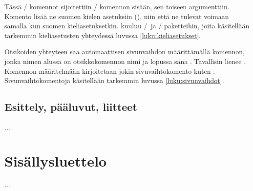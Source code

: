 \begin{koodilohkosis}
  \addto{\captionsfinnish}{
    \renewcommand{\partname}{Kausi}
    \renewcommand{\chaptername}{Päivä}
  }
\end{koodilohkosis}

Tässä \-/ komennot sijoitettiin \-/
komennon sisään, sen toiseen argumenttiin. Komento  lisää
ne suomen kielen asetuksiin (), niin että ne
tulevat voimaan samalla kun suomen kieliasetuksetkin. 
kuuluu \-/\ ja \-/ paketteihin,
joita käsitellään tarkemmin kieliasetusten yhteydessä luvussa
\ref{luku:kieliasetukset}.

Otsikoiden yhteyteen saa automaattisen sivunvaihdon määrittämällä
komennon, jonka nimen alussa on otsikkokomennon nimi ja lopussa sana
. Tavallisin lienee . Komennon
määritelmään kirjoitetaan jokin sivuvaihtokomento kuten
. Sivunvaihtokomentoja käsitellään tarkemmin luvussa
\ref{luku:sivunvaihdot}.

\begin{koodilohkosis}
  \newcommand{\sectionbreak}{\clearpage}
\end{koodilohkosis}

\subsection{Esittely, pääluvut, liitteet}
\label{luku:frontmainbackmatter}

...



\section{Sisällysluettelo}
\label{luku:sisallysluettelo}

...

